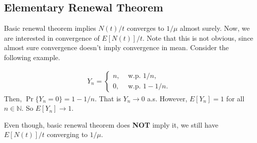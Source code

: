 \documentclass[a4paper,10pt, english]{article}
\begin{document}
\subsection{Elementary Renewal Theorem}
Basic renewal theorem implies $N(t)/t$ converges to $1/\mu$ almost surely. Now, we are interested in convergence of $E[N(t)]/t$. Note that this is not obvious, since almost sure convergence doesn't imply convergence in mean. Consider the following example.
\begin{exmp}
\begin{align*}
Y_n = \begin{cases}
n, & \mbox{ w.p.  } 1/n,\\
0, & \mbox{ w.p.  } 1- 1/n.
\end{cases}
\end{align*}
Then, $\Pr\{ Y_n = 0 \} = 1 - 1/n$. %
That is $Y_n \to 0$ a.s. However, $E[Y_n] = 1$ for all $n \in \mathbb{N}$. So $E[Y_n] \to 1$.
\end{exmp}
Even though, basic renewal theorem does \textbf{NOT} imply it, we still have $E[N(t)]/t$ converging to $1/\mu$.
\end{document}
